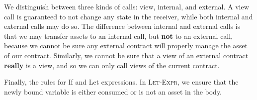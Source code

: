 \documentclass[10pt]{article}
\begin{document}
We distinguish between three kinds of calls: view, internal, and external.
A view call is guaranteed to not change any state in the receiver, while both internal and external calls may do so.
The difference between internal and external calls is that we may transfer assets to an internal call, but \textbf{not} to an external call, because we cannot be sure any external contract will properly manage the asset of our contract.
Similarly, we cannot be sure that a view of an external contract \textbf{really} is a view, and so we can only call views of the current contract.
\begin{mathpar}


\end{mathpar}

Finally, the rules for If and Let expressions.
In \textsc{Let-Expr}, we ensure that the newly bound variable is either consumed or is not an asset in the body.
\begin{mathpar}

\end{mathpar}
\end{document}
